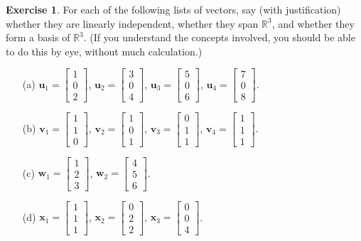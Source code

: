 \documentclass{amsart}
\newcommand{\R}         {{\mathbb{R}}}
\newcommand{\bsm}       {\left[\begin{smallmatrix}}
\newcommand{\esm}       {\end{smallmatrix}\right]}
\newcommand{\vu}        {\mathbf{u}}
\newcommand{\vv}        {\mathbf{v}}
\newcommand{\vw}        {\mathbf{w}}
\newcommand{\vx}        {\mathbf{x}}
\renewcommand{\:}       {\colon}
\theoremstyle{definition}
\newtheorem{exercise}{Exercise}[section]
\begin{document}
\begin{exercise}
 For each of the following lists of vectors, say (with justification) whether
 they are linearly independent, whether they span $\R^3$,
 and whether they form a basis of $\R^3$.  (If you
 understand the concepts involved, you should be able to do
 this by eye, without much calculation.)
 \begin{itemize}
  \item[(a)] $\vu_1=\bsm 1\\0\\2\esm$, 
             $\vu_2=\bsm 3\\0\\4\esm$,
             $\vu_3=\bsm 5\\0\\6\esm$,
             $\vu_4=\bsm 7\\0\\8\esm$.
  \item[(b)] $\vv_1=\bsm 1\\1\\0\esm$,
             $\vv_2=\bsm 1\\0\\1\esm$,
             $\vv_3=\bsm 0\\1\\1\esm$,
             $\vv_4=\bsm 1\\1\\1\esm$.
  \item[(c)] $\vw_1=\bsm 1\\2\\3\esm$,
             $\vw_2=\bsm 4\\5\\6\esm$.
  \item[(d)] $\vx_1=\bsm 1\\1\\1\esm$,
             $\vx_2=\bsm 0\\2\\2\esm$,
             $\vx_3=\bsm 0\\0\\4\esm$.
 \end{itemize}
\end{exercise}
\end{document}

